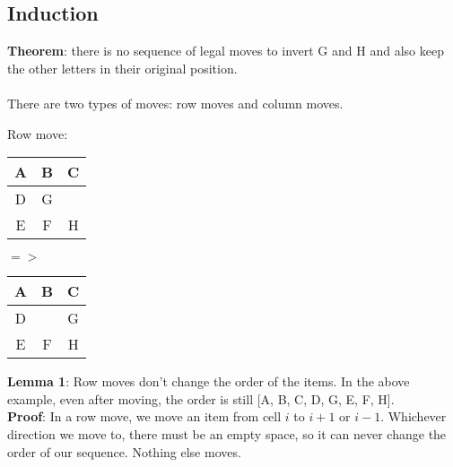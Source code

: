 \documentclass{article}
\begin{document}
	\pagebreak
	
	\subsection{Induction}
	\textbf{Theorem}: there is no sequence of legal moves to invert G and H and also keep the other letters in their original position.\\\\
	There are two types of moves: row moves and column moves.\\
	\begin{center}
		Row move:\\
		$ $\\
		\begin{tabular}{ |c|c|c| } 
			\hline
			A & B & C \\
			\hline
			D & G & \\ 
			\hline
			E & F & H\\ 
			\hline
		\end{tabular} $=>$
		\begin{tabular}{ |c|c|c| } 
			\hline
			A & B & C \\
			\hline
			D &  & G \\ 
			\hline
			E & F & H\\ 
			\hline
		\end{tabular}
	\end{center}
	\textbf{Lemma 1}: Row moves don't change the order of the items. In the above example, even after moving, the order is still [A, B, C, D, G, E, F, H].\\
	\textbf{Proof}: In a row move, we move an item from cell $i$ to $i + 1$ or $i - 1$. Whichever direction we move to, there must be an empty space, so it can never change the order of our sequence. Nothing else moves. \qedsymbol
	
\end{document}
